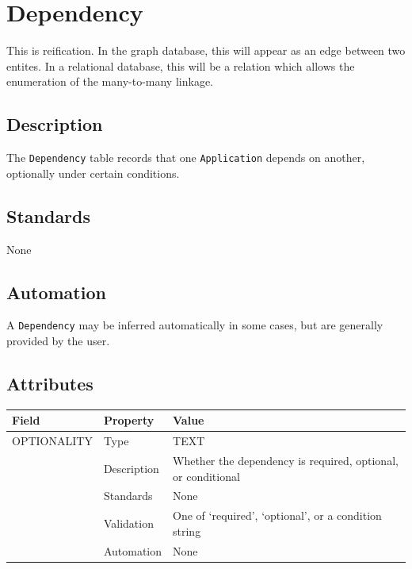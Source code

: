 \documentclass[
]{article}
\newcounter{none}
\begin{document}
\section{Dependency}\label{dependency}

This is reification. In the graph database, this will appear as an edge
between two entites. In a relational database, this will be a relation
which allows the enumeration of the many-to-many linkage.

\subsection{Description}\label{description-10}

The \texttt{Dependency} table records that one \texttt{Application}
depends on another, optionally under certain conditions.

\subsection{Standards}\label{standards-12}

None

\subsection{Automation}\label{automation-12}

A \texttt{Dependency} may be inferred automatically in some cases, but
are generally provided by the user.

\subsection{Attributes}\label{attributes-12}

{\def\LTcaptype{none} 
\begin{longtable}[]{@{}
  >{\raggedright\arraybackslash}p{}
  >{\raggedright\arraybackslash}p{}
  >{\raggedright\arraybackslash}p{}@{}}
\toprule\noalign{}
\begin{minipage}[b]{\linewidth}\raggedright
Field
\end{minipage} & \begin{minipage}[b]{\linewidth}\raggedright
Property
\end{minipage} & \begin{minipage}[b]{\linewidth}\raggedright
Value
\end{minipage} \\
\midrule\noalign{}
\endhead
\bottomrule\noalign{}
\endlastfoot
OPTIONALITY & Type & TEXT \\
& Description & Whether the dependency is required, optional, or
conditional \\
& Standards & None \\
& Validation & One of `required', `optional', or a condition string \\
& Automation & None \\
\end{longtable}
}
\end{document}
